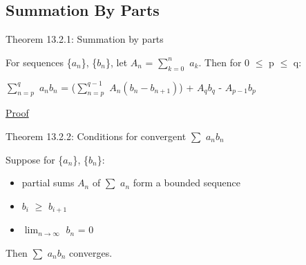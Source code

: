 \subsection{ Summation By Parts }

{ \color{red} Theorem 13.2.1: Summation by parts }

    \begin{adjustbox}{minipage=14cm, right, vspace=0.1cm 0cm}
        For sequences \{$a_n$\}, \{$b_n$\}, let $A_n$ = $\sum_{k=0}^n$ $a_k$.
        Then for 0 $\leq$ p $\leq$ q:

        \hspace{1cm}
        $\sum_{n = p}^q$ $a_n b_n$
        = ($\sum_{n = p}^{q-1}$ $A_n (b_n - b_{n+1})$)
        + $A_q b_q$ - $A_{p-1} b_p$
    \end{adjustbox}

{ \color{magenta} \underline{Proof} }


    \vspace{0.5cm}

{ \color{red} Theorem 13.2.2: Conditions for convergent $\sum$ $a_n b_n$ }

    \begin{adjustbox}{minipage=14cm, right, vspace=0.1cm 0cm}
        Suppose for \{$a_n$\}, \{$b_n$\}:

        \begin{itemize}[leftmargin=1cm, itemsep=0.1cm]
            \item partial sums $A_n$ of $\sum$ $a_n$ form a bounded sequence
            
            \item $b_i$ $\geq$ $b_{i+1}$
            
            \item $\lim_{n \rightarrow \infty}$ $b_n$ = 0
        \end{itemize}

        Then $\sum$ $a_n b_n$ converges.
    \end{adjustbox}

